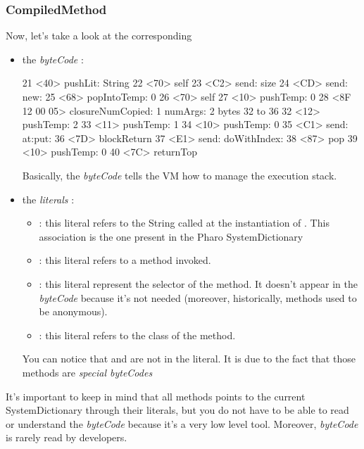 \subsubsection*{CompiledMethod}
Now, let's take a look at the corresponding 
\begin{itemize}
	\item the \emph{byteCode} : 
	\begin{code}{}
		21 <40> pushLit: String
		22 <70> self
		23 <C2> send: size
		24 <CD> send: new:
		25 <68> popIntoTemp: 0
		26 <70> self
		27 <10> pushTemp: 0
		28 <8F 12 00 05> closureNumCopied: 1 numArgs: 2 bytes 32 to 36
		32 	<12> pushTemp: 2
		33 	<11> pushTemp: 1
		34 	<10> pushTemp: 0
		35 	<C1> send: at:put:
		36 	<7D> blockReturn
		37 <E1> send: doWithIndex:
		38 <87> pop
		39 <10> pushTemp: 0
		40 <7C> returnTop
	\end{code}
	Basically, the \emph{byteCode} tells the \gls{VM} how to manage the execution stack. 
		\item the \emph{literals} : 
		\begin{itemize}
			\item {} : this literal refers to the String called at the instantiation of . This association is the one present in the \gls{Pharo} SystemDictionary
			\item {} : this literal refers to a method invoked.
			\item {} : this literal represent the selector of the method. It doesn't appear in the \emph{byteCode} because it's not needed (moreover, historically, methods used to be anonymous).
			\item {} : this literal refers to the class of the method.
		\end{itemize}
		You can notice that  and  are not in the literal. It is due to the fact that those methods are \emph{special byteCodes}
\end{itemize}

It's important to keep in mind that all methods points to the current SystemDictionary through their literals, but you do not have to be able to read or understand the \emph{byteCode} because it's a very low level tool. Moreover, \emph{byteCode} is rarely read by developers.
